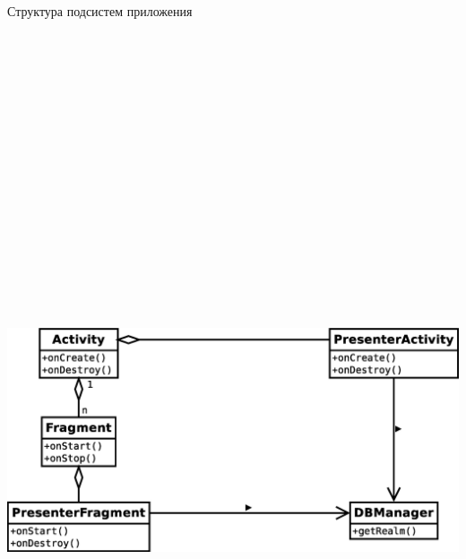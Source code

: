\documentclass[russian,utf8,a1paper,nostitching,simple]{eskdgraph}
\begin{document}
\begin{ESKDdrawing}
  \centering
  {\fontsize{50}{60}\selectfont Структура подсистем приложения}

  \vspace{2cm}
  \begin{minipage}{50cm}
    \centering
     \\
    \vspace{2cm}
    \centering
    \includegraphics[height=23cm]{fig/implementation_bl_presenter.eps}

\end{minipage}
\end{ESKDdrawing}
\end{document}
